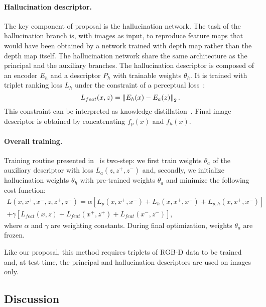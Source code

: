 \paragraph{Hallucination descriptor.} The key component of \citet{Hoffman2016} proposal is the hallucination network. The task of the hallucination branch is, with images as input, to reproduce feature maps that would have been obtained by a network trained with depth map rather than the depth map itself. The hallucination network share the same architecture as the principal and the auxiliary branches. The hallucination descriptor is composed of an encoder $E_h$ and a descriptor $P_h$ with trainable weights $\theta_h$. It is trained with triplet ranking loss $L_h$ under the constraint of a perceptual loss~\citep{Johnson2016}:
\begin{equation}
	\label{eq:perceptual_loss}
	L_{feat}(x, z) = \left\lVert E_h(x) - E_a(z)\right\rVert_2.
\end{equation}
This constraint can be interpreted as knowledge distillation~\citep{hinton2015distilling}. Final image descriptor is obtained by concatenating $f_p(x)$ and $f_h(x)$.

\paragraph{Overall training.} Training routine presented in~\citep{Hoffman2016} is two-step: we first train weights $\theta_a$ of the auxiliary descriptor with loss $L_a(z, z^+, z^-)$ and, secondly, we initialize hallucination weights $\theta_h$ with pre-trained weights $\theta_a$ and minimize the following cost function:
\begin{multline}
	\label{eq:overall_hall_loss}
	L(x, x^+, x^-,z, z^+, z^-) = \alpha\left[ L_p(x, x^+, x^-) + L_h(x, x^+, x^-) + L_{p,h}(x, x^+, x^-) \right]\\
	+ \gamma\left[ L_{feat}(x, z) + L_{feat}(x^+, z^+) + L_{feat}(x^-, z^-) \right],
\end{multline}
where $\alpha$ and $\gamma$ are weighting constants. During final optimization, weights $\theta_a$ are frozen. 

Like our proposal, this method requires triplets of RGB-D data to be trained and, at test time, the principal and hallucination descriptors are used on images only.

\subsection{Discussion}

